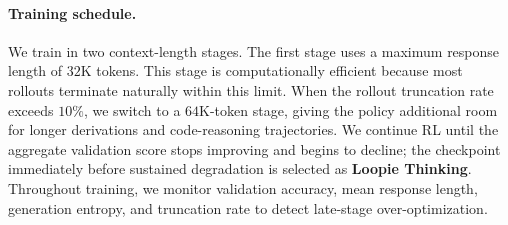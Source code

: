\paragraph{Training schedule.}
We train in two context-length stages. The first stage uses a maximum response
length of $32$K tokens. This stage is computationally efficient because most
rollouts terminate naturally within this limit. When the rollout truncation
rate exceeds $10\%$, we
switch to a $64$K-token stage, giving the policy additional room for longer
derivations and code-reasoning trajectories. We continue RL until the aggregate
validation score stops improving and begins to decline; the checkpoint
immediately before sustained degradation is selected as \textbf{Loopie
Thinking}. Throughout training, we monitor validation accuracy, mean response
length, generation entropy, and truncation rate to detect late-stage
over-optimization.







